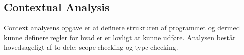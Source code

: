 \subsection{Contextual Analysis}\label{ssec:contextual}
Context analysens opgave er at definere strukturen af programmet og dermed kunne definere regler for hvad er er lovligt at kunne udføre.
    Analysen består hovedsageligt af to dele; scope checking og type checking. 